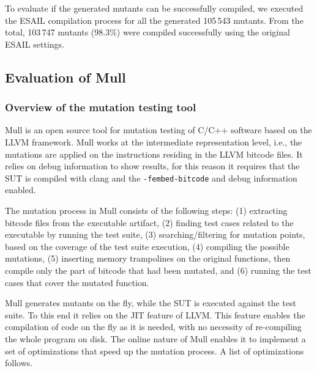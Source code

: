 










To evaluate if the generated mutants can be successfully compiled, we executed the ESAIL compilation process for all the generated 105\,543 mutants. From the total, 103\,747 mutants (98.3\%) were compiled successfully using the original ESAIL settings.

\subsection{Evaluation of Mull}
\label{subsec:mull}

\subsubsection{Overview of the mutation testing tool}

Mull is an open source tool for mutation testing of C/C++ software based on the LLVM framework. Mull works at the intermediate representation level, i.e., the mutations are applied on the instructions residing in the LLVM bitcode files. It relies on debug information to show results, for this reason it requires that the SUT is compiled with clang and the \texttt{-fembed-bitcode} and debug information enabled.

The mutation process in Mull consists of the following steps: (1) extracting bitcode files from the executable artifact, (2) finding test cases related to the executable by running the test suite, (3) searching/filtering for mutation points, based on the coverage of the test suite execution, (4) compiling the possible mutations, (5) inserting memory trampolines on the original functions, then compile only the part of bitcode that had been mutated, and (6) running the test cases that cover the mutated function.

Mull generates mutants on the fly, while the SUT is executed against the test suite. To this end it relies on the JIT feature of LLVM. This feature enables the compilation of code on the fly as it is needed, with no necessity of re-compiling the whole program on disk. The online nature of Mull enables it to implement a set of optimizations that speed up the mutation process. A list of optimizations follows.

